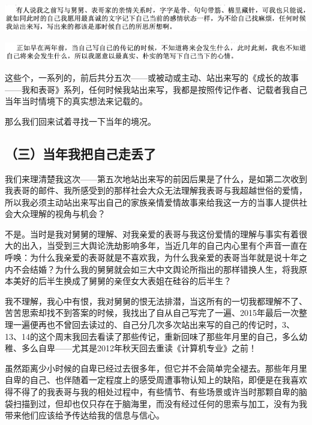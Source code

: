 \documentclass[9pt, b5paper]{article}
\begin{document}
\begin{center}
\includegraphics[width=.9\linewidth]{./pic/backups_plans_20210426_114722.png}
\end{center}

\begin{center}
\includegraphics[width=.9\linewidth]{./pic/backups_plans_20210426_114834.png}
\end{center}

这些个，一系列的，前后共分五次——或被动或主动、站出来写的《成长的故事——我和表哥》系列，任何时候我站出来写，我都是按照传记作者、记载者我自己当年当时情境下的真实想法来记载的。

那么我们回来试着寻找一下当年的境况。

\subsection{（三）当年我把自己走丢了}
\label{sec:org2e886f2}

我们来理清楚我这次——第五次地站出来写的前因后果是了什么，是如第二次收到我表哥的邮件、我所感受到的那样社会大众无法理解我表哥与我超越世俗的爱情，所以我必须主动站出来写出自己的家族亲情爱情故事来给我这一方的当事人提供社会大众理解的视角与机会？

不是。当时是我对舅舅的理解、对我亲爱的表哥与我这份爱情的理解与事实有着很大的出入，当受到三大舆论洗劫影响多年，当近几年的自己内心里有个声音一直在呼唤：为什么我亲爱的表哥就是不喜欢我，为什么我亲爱的表哥当年就是说十年之内不会结婚？为什么我的舅舅就会如三大中文舆论所指出的那样错换人生，将我原本美好的后半生换成了舅舅的亲侄女大表姐在硅谷的后半生？

我不理解，我心中有恨，我对舅舅的恨无法排潜，当这所有的一切我都理解不了、苦苦思索却找不到答案的时候，我找出了自从自己写完了一遍、2015年最后一次整理一遍便再也不曾回去读过的、自己分几次多次站出来写的自己的传记时，3、13、14的这个周末我回去看读了那些传记，重新回味了那些年月里的自己，多么幼稚、多么自卑——尤其是2012年秋天回去重读《计算机专业》之前！

虽然距离少小时候的自卑已经过去很多年，但它并不会简单完全褪去。那些年月里自卑的自己、也伴随着一定程度上的感受周遭事物认知上的缺陷，即便是在我喜欢得不得了的我表哥与我的相处过程中，有些情节、有些场景或许当时那颗自卑的脑袋扫描到过，但却也仅只存在于脑海里，而没有经过任何的思索与加工，没有为我带来他们应该给予传达给我的信息与信心。
\end{document}
